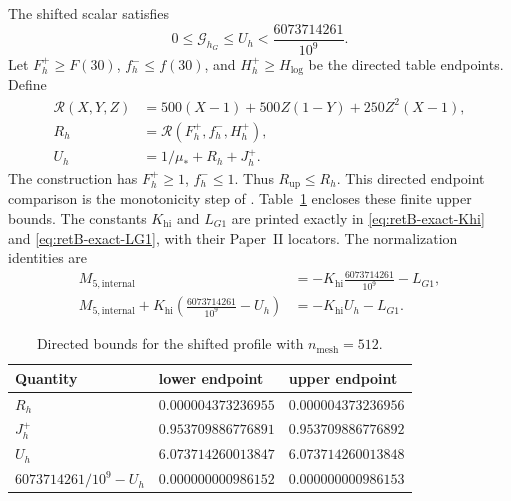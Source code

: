 \begin{proposition}\label{prop:app-m5-cap}
The shifted scalar satisfies
\begin{equation}\label{eq:app-m5-cap}
 0\le\mathcal G_{h_G}\le U_h<\frac{6073714261}{10^9}.
\end{equation}
Let \(F_h^+\ge F(30)\), \(f_h^-\le f(30)\),
and \(H_h^+\ge H_{\log}\) be the directed table endpoints.
Define
\begin{equation}\label{eq:app-directed-tail}
\begin{aligned}
 \mathcal R(X,Y,Z)&=500(X-1)+500Z(1-Y)
                             +250Z^2(X-1),\\
 R_h&=\mathcal R(F_h^+,f_h^-,H_h^+),\\
 U_h&=1/\mu_*+R_h+J_h^+.
\end{aligned}
\end{equation}
The construction has \(F_h^+\ge1\), \(f_h^-\le1\).
Thus \(R_{\mathrm{up}}\le R_h\). This directed endpoint comparison is the
monotonicity step of \cite[\S4.6, (4.73)]{PaperII}.
Table~\ref{tab:app-m5} encloses these finite upper bounds.
The constants $K_{\mathrm{hi}}$ and $L_{G1}$ are printed exactly in
\eqref{eq:retB-exact-Khi} and \eqref{eq:retB-exact-LG1}, with their
Paper~II locators.
The normalization identities are
\begin{equation}\label{eq:app-m5-normalization}
\begin{aligned}
 M_{5,\mathrm{internal}}
 &=-K_{\mathrm{hi}}\frac{6073714261}{10^9}-L_{G1},\\
 M_{5,\mathrm{internal}}+
 K_{\mathrm{hi}}\left(\frac{6073714261}{10^9}-U_h\right)
 &=-K_{\mathrm{hi}}U_h-L_{G1}.
\end{aligned}
\end{equation}
\end{proposition}

\begin{table}[ht]
\centering\small
\caption{Directed bounds for the shifted profile with $n_{\mathrm{mesh}}=512$.}
\label{tab:app-m5}
\begin{tabular}{@{}lll@{}}
\hline
Quantity & lower endpoint & upper endpoint\\
\hline
\(R_h\) & \(0.000004373236955\) & \(0.000004373236956\)\\
\(J_h^+\) & \(0.953709886776891\)
 & \(0.953709886776892\)\\
\(U_h\) & \(6.073714260013847\)
 & \(6.073714260013848\)\\
\(6073714261/10^9-U_h\)
 & \(0.000000000986152\)
 & \(0.000000000986153\)\\
\hline
\end{tabular}
\end{table}

